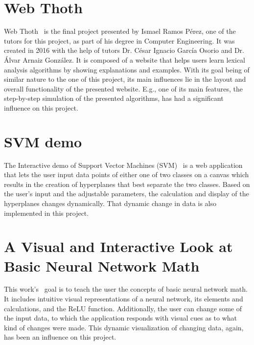 
\section{Web Thoth}
Web Thoth~\cite{web_thoth} is the final project presented by Ismael Ramos Pérez, one of the tutors for this project, as part of his degree in Computer Engineering. It was created in 2016 with the help of tutors Dr. César Ignacio García Osorio and Dr. Álvar Arnaiz González. It is composed of a website that helps users learn lexical analysis algorithms by showing explanations and examples. With its goal being of similar nature to the one of this project, its main influences lie in the layout and overall functionality of the presented website. E.g., one of its main features, the step-by-step simulation of the presented algorithms, has had a significant influence on this project.

\section{SVM demo}
The Interactive demo of Support Vector Machines (SVM)~\cite{svm_demo} is a web application that lets the user input data points of either one of two classes on a canvas which results in the creation of hyperplanes that best separate the two classes. Based on the user's input and the adjustable parameters, the calculation and display of the hyperplanes changes dynamically. That dynamic change in data is also implemented in this project.

\section{A Visual and Interactive Look at Basic Neural Network Math}
This work's~\cite{neural_network_math_demo} goal is to teach the user the concepts of basic neural network math. It includes intuitive visual representations of a neural network, its elements and calculations, and the ReLU function. Additionally, the user can change some of the input data, to which the application responds with visual cues as to what kind of changes were made. This dynamic visualization of changing data, again, has been an influence on this project.